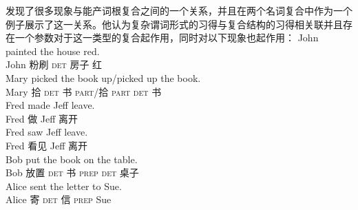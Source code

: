  \citet{Snyder2001a}发现了很多现象与能产词根复合之间的一个关系，并且在两个名词复合中作为一个例子展示了这一关系。他认为复杂谓词形式的习得与复合结构的习得相关联并且存在一个参数对于这一类型的复合起作用，同时对以下现象也起作用：
\eal\settowidth{}
\ex 
\gll John painted the house red. \\
     John 粉刷 \textsc{det} 房子 红\\              
\ex 
\gll Mary picked the book up/picked up the book. \\           
     Mary 拾 \textsc{det} 书 \textsc{part}/拾 \textsc{part} \textsc{det} 书\\ 
\ex 
\gll Fred made Jeff leave. \\
    Fred 做 Jeff 离开\\              
\ex 
\gll Fred saw Jeff leave.\\ 
    Fred 看见 Jeff 离开\\             
\ex 
\gll Bob put the book on the table. \\
    Bob 放置 \textsc{det} 书 \textsc{prep} \textsc{det} 桌子\\               
\ex 
\gll Alice sent the letter to Sue.  \\
    Alice 寄 \textsc{det} 信 \textsc{prep} Sue\\             

